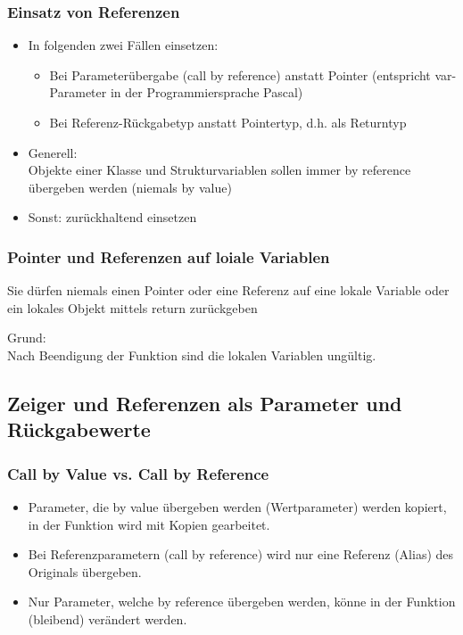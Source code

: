 \subsubsection{Einsatz von Referenzen\hfill}
\label{sec:unterunterabschnitt}
\begin{itemize}
	\item In folgenden zwei Fällen einsetzen:
	\begin{itemize}
		\item Bei Parameterübergabe (call by reference) anstatt Pointer (entspricht var-Parameter in der Programmiersprache Pascal)
		\item Bei Referenz-Rückgabetyp anstatt Pointertyp, d.h. als Returntyp
	\end{itemize}
	\item\Large Generell:\\Objekte einer Klasse und Strukturvariablen sollen immer by reference übergeben werden (niemals by value)\normalsize
	\item Sonst: zurückhaltend einsetzen
\end{itemize}

\subsubsection{Pointer und Referenzen auf loiale Variablen\hfill}
\label{sec:unterunterabschnitt}
\begin{achtung}
Sie dürfen niemals einen Pointer oder eine Referenz auf eine lokale Variable oder ein lokales Objekt mittels return zurückgeben
\end{achtung}
Grund:\\Nach Beendigung der Funktion sind die lokalen Variablen ungültig.


\subsection{Zeiger und Referenzen als Parameter und Rückgabewerte\hfill}
\label{sec:unterabschnitt}

\subsubsection{Call by Value vs. Call by Reference\hfill}
\label{sec:unterunterabschnitt}
\begin{itemize}
	\item Parameter, die by value übergeben werden (Wertparameter) werden kopiert, in der Funktion wird mit Kopien gearbeitet.
	\item Bei Referenzparametern (call by reference) wird nur eine Referenz (Alias) des Originals übergeben.
	\item Nur Parameter, welche by reference übergeben werden, könne in der Funktion (bleibend) verändert werden.
\end{itemize}


